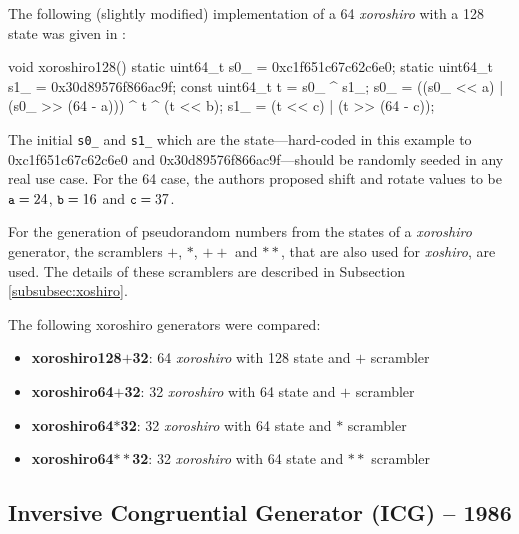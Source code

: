     The following (slightly modified) implementation of a \SI{64}{\bit} \emph{xoroshiro} with a \SI{128}{\bit} state was given in \cite{Blackman:2018}:
\begin{@empty}
    \lstset{
        language = [ISO]C++
    }
\begin{centeredshadowboxlisting}
void xoroshiro128() {
    static uint64_t s0_ = 0xc1f651c67c62c6e0;
    static uint64_t s1_ = 0x30d89576f866ac9f;
    const uint64_t t = s0_ ^ s1_;
    s0_ = ((s0_ << a) | (s0_ >> (64 - a)))
        ^ t ^ (t << b);
    s1_ = (t << c) | (t >> (64 - c));
}
\end{centeredshadowboxlisting}
\end{@empty}
    \textcolor{black!75}{The initial \lstinline|s0_| and \lstinline|s1_| which are the state---hard-coded in this example to 0xc1f651c67c62c6e0 and 0x30d89576f866ac9f---should be randomly seeded in any real use case.} For the \SI{64}{\bit} case, the authors proposed shift and rotate values to be $\texttt{\small a} = 24$, $\texttt{\small b} = 16$ and $\texttt{\small c} = 37$.

    For the generation of pseudorandom numbers from the states of a \emph{xoroshiro} generator, the scramblers $\mathbf{+}$, $\mathbf{*}$, $\mathbf{++}$ and $\mathbf{**}$, that are also used for \emph{xoshiro}, are used. The details of these scramblers are described in Subsection \ref{subsubsec:xoshiro}.

    The following xoroshiro generators were compared:
    \begin{itemize}
        \itemsep0em
        \item \textbf{xoroshiro128$\mathbf{+}$32}: \SI{64}{\bit} \emph{xoroshiro} with \SI{128}{\bit} state and $\mathbf{+}$ scrambler
        \item \textbf{xoroshiro64$\mathbf{+}$32}:  \SI{32}{\bit} \emph{xoroshiro} with \SI{64}{\bit} state and $\mathbf{+}$ scrambler
        \item \textbf{xoroshiro64$\mathbf{*}$32}:  \SI{32}{\bit} \emph{xoroshiro} with \SI{64}{\bit} state and $\mathbf{*}$ scrambler
        \item \textbf{xoroshiro64$\mathbf{**}$32}: \SI{32}{\bit} \emph{xoroshiro} with \SI{64}{\bit} state and $\mathbf{**}$ scrambler
    \end{itemize}

\subsection[Inversive Congruential Generator (ICG) -- 1986]{Inversive Congruential Generator (ICG) -- 1986} \label{subsec:icg}

